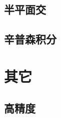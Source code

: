 \documentclass[UTF8,a4paper]{ctexart}
\begin{document}
\subsection{半平面交}

\subsection{辛普森积分}

\section{其它}

\subsection{高精度}

\maketitle 
\end{document}
